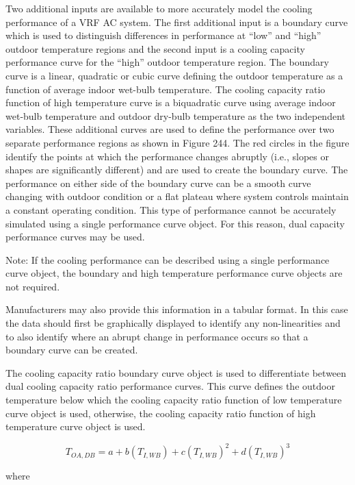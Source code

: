 Two additional inputs are available to more accurately model the cooling performance of a VRF AC system. The first additional input is a boundary curve which is used to distinguish differences in performance at ``low'' and ``high'' outdoor temperature regions and the second input is a cooling capacity performance curve for the ``high'' outdoor temperature region. The boundary curve is a linear, quadratic or cubic curve defining the outdoor temperature as a function of average indoor wet-bulb temperature. The cooling capacity ratio function of high temperature curve is a biquadratic curve using average indoor wet-bulb temperature and outdoor dry-bulb temperature as the two independent variables. These additional curves are used to define the performance over two separate performance regions as shown in Figure 244. The red circles in the figure identify the points at which the performance changes abruptly (i.e., slopes or shapes are significantly different) and are used to create the boundary curve. The performance on either side of the boundary curve can be a smooth curve changing with outdoor condition or a flat plateau where system controls maintain a constant operating condition. This type of performance cannot be accurately simulated using a single performance curve object. For this reason, dual capacity performance curves may be used.

Note: If the cooling performance can be described using a single performance curve object, the boundary and high temperature performance curve objects are not required.

Manufacturers may also provide this information in a tabular format. In this case the data should first be graphically displayed to identify any non-linearities and to also identify where an abrupt change in performance occurs so that a boundary curve can be created.

The cooling capacity ratio boundary curve object is used to differentiate between dual cooling capacity ratio performance curves. This curve defines the outdoor temperature below which the cooling capacity ratio function of low temperature curve object is used, otherwise, the cooling capacity ratio function of high temperature curve object is used.

\begin{equation}
{T_{OA,DB}} = a + b\left( {{T_{I,WB}}} \right) + c{\left( {{T_{I,WB}}} \right)^2} + d{\left( {{T_{I,WB}}} \right)^3}
\end{equation}

where

